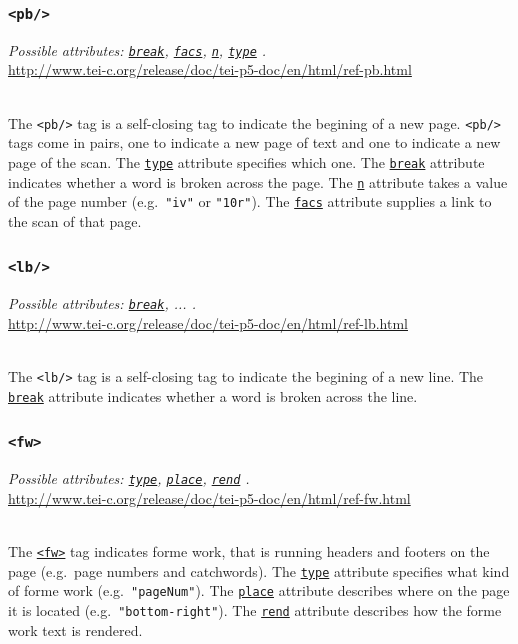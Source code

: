 \documentclass[12pt,a4paper]{article}
\newcommand{\taglinks}[2]{
\vspace*{-0.5ex}
\hspace*{\parindent}
\begin{minipage}{\textwidth}
  \emph{Possible attributes: #1.} \\ \url{#2} \end{minipage} \vspace{0.5ex} \\ }
\begin{document}
\subsubsection{\texttt{<pb/>}} \label{tag-sec:pb}

\taglinks{
\hyperref[att-sec:break]{\texttt{break}}, 
\hyperref[att-sec:facs]{\texttt{facs}}, 
\hyperref[att-sec:n]{\texttt{n}}, 
\hyperref[att-sec:type]{\texttt{type}} 
}
{http://www.tei-c.org/release/doc/tei-p5-doc/en/html/ref-pb.html}
%
The \texttt{<pb/>} tag is a self-closing tag to indicate the begining of a new page.  \texttt{<pb/>} tags come in pairs, one to indicate a new page of text and one to indicate a new page of the scan.  The \hyperref[att-sec:type]{\texttt{type}} attribute specifies which one.  The \hyperref[att-sec:break]{\texttt{break}} attribute indicates whether a word is broken across the page.  The \hyperref[att-sec:n]{\texttt{n}} attribute takes a value of the page number (e.g.\ \texttt{"iv"} or \texttt{"10r"}).  The \hyperref[att-sec:facs]{\texttt{facs}} attribute supplies a link to the scan of that page.

\subsubsection{\texttt{<lb/>}} \label{tag-sec:lb}
\taglinks{
\hyperref[att-sec:break]{\texttt{break}}, ... }
{http://www.tei-c.org/release/doc/tei-p5-doc/en/html/ref-lb.html}
%
The \texttt{<lb/>} tag is a self-closing tag to indicate the begining of a new line.  The \hyperref[att-sec:break]{\texttt{break}} attribute indicates whether a word is broken across the line.

\subsubsection{\texttt{<fw>}} \label{tag-sec:fw}
\taglinks{
\hyperref[att-sec:type]{\texttt{type}}, 
\hyperref[att-sec:place]{\texttt{place}}, 
\hyperref[att-sec:rend]{\texttt{rend}}
}
{http://www.tei-c.org/release/doc/tei-p5-doc/en/html/ref-fw.html}
%
The \hyperref[tag-sec:fw]{\texttt{<fw>}} tag indicates forme work, that is running headers and footers on the page (e.g.\ page numbers and catchwords).  The \hyperref[att-sec:type]{\texttt{type}} attribute specifies what kind of forme work (e.g.\ \texttt{"pageNum"}).  The \hyperref[att-sec:place]{\texttt{place}} attribute describes where on the page it is located (e.g.\ \texttt{"bottom-right"}).  The \hyperref[att-sec:rend]{\texttt{rend}} attribute describes how the forme work text is rendered.
\end{document}
